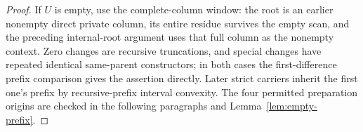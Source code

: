 \begin{proof}
If $U$ is empty, use the complete-column window: the root is an earlier
nonempty direct private column, its entire residue survives the empty
scan, and the preceding internal-root argument uses that full column
as the nonempty context. Zero changes are recursive truncations, and
special changes have repeated identical same-parent constructors; in
both cases the first-difference prefix comparison gives the assertion
directly. Later strict carriers inherit the first one's prefix by
recursive-prefix interval convexity. The four permitted preparation
origins are checked in the following paragraphs and
Lemma~\ref{lem:empty-prefix}.
\end{proof}
